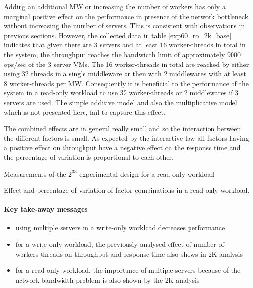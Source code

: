 \documentclass[report.tex]{subfiles}
\begin{document}
Adding an additional MW or increasing the number of workers has only a marginal positive effect on the performance in presence of the network bottleneck without increasing the number of servers. This is consistent with observations in previous sections. 
However, the collected data in table \ref{exp60_ro_2k_base} indicates that given there are 3 servers and at least 16 worker-threads in total in the system, the throughput reaches the bandwidth limit of approximately 9000 ops/sec of the 3 server VMs. The 16 worker-threads in total are reached by either using 32 threads in a single middleware or then with 2 middlewares with at least 8 worker-threads per MW.
Consequently it is beneficial to the performance of the system in a read-only workload to use 32 worker-threads or 2 middlewares if 3 servers are used.
The simple additive model and also the multiplicative model which is not presented here, fail to capture this effect.

The combined effects are in general really small and so the interaction between the different factors is small.
As expected by the interactive law all factors having a positive effect on throughput have a negative effect on the response time and the percentage of variation is proportional to each other.



\begin{table}[H]
	\centering
	\small{
		\setlength{\tabcolsep}{4.7pt}
		
		\caption{Measurements of the $2^33$ experimental design for a read-only workload}\label{exp60_ro_2k_base} 
	}
\end{table}

\begin{table}[H]
	\small{
		\centering
		\setlength{\tabcolsep}{4.5pt}
		\newcommand{\rlft}[0]{\raggedleft\arraybackslash}
		
		\caption{Effect and percentage of variation of factor combinations in a read-only workload.}\label{exp60_ro_2k_effect}
	}
\end{table}


\paragraph{Key take-away messages}
\begin{itemize}
	\vitemsep
	\item using multiple servers in a write-only workload decreases performance
	\item for a write-only workload, the previously analysed effect of number of workers-threads on throughput and response time also  shows in 2K analysis
	\item for a read-only workload, the importance of multiple servers because of the network bandwidth problem is also shown by the 2K analysis 
\end{itemize}
\end{document}
